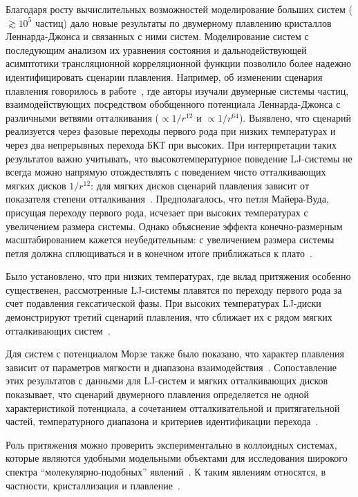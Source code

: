 Благодаря росту вычислительных возможностей моделирование больших систем ($\gtrsim 10^5$ частиц) дало новые результаты по двумерному плавлению кристаллов Леннарда-Джонса и связанных с ними систем.
Моделирование систем с последующим анализом их уравнения состояния и дальнодействующей асимптотики трансляционной корреляционной функции позволило более надежно идентифицировать сценарии плавления.
Например, об изменении сценария плавления говорилось в работе~\cite{10.1103/physreve.99.022145}, где авторы изучали двумерные системы частиц, взаимодействующих посредством обобщенного потенциала Леннарда-Джонса с различными ветвями отталкивания ($\propto 1/r ^{12}$ и $\propto 1/r^{64}$).
Выявлено, что сценарий реализуется через фазовые переходы первого рода при низких температурах и через два непрерывных перехода БКТ при высоких.
При интерпретации таких результатов важно учитывать, что высокотемпературное поведение LJ-системы не всегда можно напрямую отождествлять с поведением чисто отталкивающих мягких дисков $1/r^{12}$: для мягких дисков сценарий плавления зависит от показателя степени отталкивания~\cite{10.1103/physrevlett.114.035702}.
Предполагалось, что петля Майера-Вуда, присущая переходу первого рода, исчезает при высоких температурах с увеличением размера системы.
Однако объяснение эффекта конечно-размерным масштабированием кажется неубедительным: с увеличением размера системы петля должна сплющиваться и в конечном итоге приближаться к плато~\cite{10.1103/physreve.87.042134, 10.1103/physreve.59.2659}.

Было установлено, что при низких температурах, где вклад притяжения особенно существенен, рассмотренные LJ-системы плавятся по переходу первого рода за счет подавления гексатической фазы.
При высоких температурах LJ-диски демонстрируют третий сценарий плавления, что сближает их с рядом мягких отталкивающих систем~\cite{10.1103/physrevlett.114.035702}.

Для систем с потенциалом Морзе также было показано, что характер плавления зависит от параметров мягкости и диапазона взаимодействия~\cite{10.1103/physrevb.103.094107}.
Сопоставление этих результатов с данными для LJ-систем и мягких отталкивающих дисков показывает, что сценарий двумерного плавления определяется не одной характеристикой потенциала, а сочетанием отталкивательной и притягательной частей, температурного диапазона и критериев идентификации перехода~\cite{10.1103/physreve.99.022145, 10.1103/physrevlett.114.035702, 10.1103/physrevlett.124.218002}.

Роль притяжения можно проверить экспериментально в коллоидных системах, которые являются удобными модельными объектами для исследования широкого спектра ``молекулярно-подобных'' явлений~\cite{book.fernandez, book.ivlev, 10.1016/0370-1573(94)90017-5, 10.1038/natrevmats.2015.11, 10.1039/c9sm01953g}.
К таким явлениям относятся, в частности, кристаллизация и плавление~\cite{10.1126/science.1112399, 10.1039/c2sm26473k, 10.1103/physrevlett.82.2721, 10.1103/physrevlett.85.3656, 10.1103/physrevlett.118.088003, 10.1039/c2sm27654b, 10.1126/science.1224763, 10.1038/s41598-021-97124-7}.

